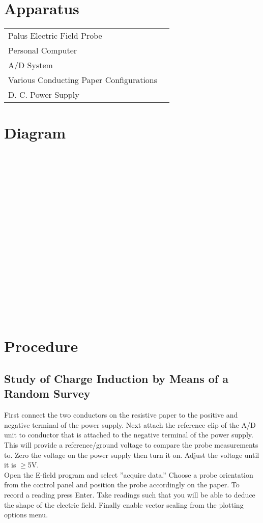 \documentclass{article}
\begin{document}
\section{Apparatus}
\begin{tabular}{ll}
Palus Electric Field Probe\\
Personal Computer\\
A/D System\\
Various Conducting Paper Configurations\\
D. C. Power Supply \\
\end{tabular}

\section{Diagram}

\ 

\ 

\ 

\ 

\ 

\ 

\ 

\ 

\ 

\ 

\section{Procedure}
\subsection{Study of Charge Induction by Means of a Random Survey}
First connect the two conductors on the resistive paper to the positive and negative terminal of the power supply. Next attach the reference clip of the A/D unit to conductor that is attached to the negative terminal of the power supply. This will provide a reference/ground voltage to compare the probe measurements to. Zero the voltage on the power supply then turn it on. Adjust the voltage until it is $\ge$5V.\\

Open the E-field program and select ''acquire data.'' Choose a probe orientation from the control panel and position the probe accordingly on the paper. To record a reading press Enter. Take readings such that you will be able to deduce the shape of the electric field. Finally enable vector scaling from the plotting options menu. \\
\end{document}
